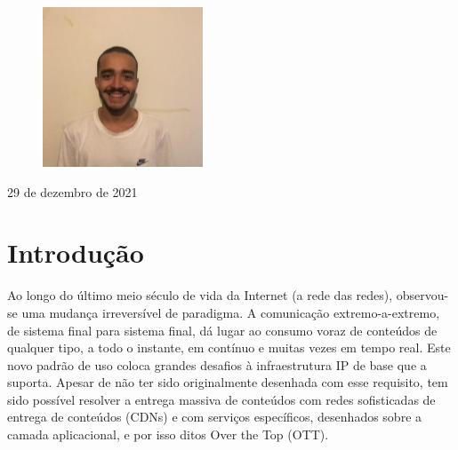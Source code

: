 \documentclass[a4paper, 11pt]{article}
\begin{document}
\begin{titlepage}
\begin{center}
\begin{figure}[!htb]
            \centering
            \captionsetup{pg47488}
        \endminipage
        \hspace{-0.2cm}
            \includegraphics[width=\linewidth]{images/Capa/154.jpg} 
            \centering
            \captionsetup{pg47577}
        \endminipage
    \end{figure}

\blindtext

\vspace{2cm}
        
        29 de dezembro de 2021
            
    \end{center}
\end{titlepage}

\newpage
\tableofcontents
\newpage
\section{Introdução}
Ao longo do último meio século de vida da Internet (a rede das redes), observou-se uma mudança irreversível de paradigma. A comunicação extremo-a-extremo, de sistema final para sistema final, dá lugar ao consumo voraz de conteúdos de qualquer tipo, a todo o instante, em contínuo e muitas vezes em tempo real. Este novo padrão de uso coloca grandes desafios à infraestrutura IP de base que a suporta. Apesar de não ter sido originalmente desenhada com esse requisito, tem sido possível resolver a entrega massiva de conteúdos com redes sofisticadas de entrega de conteúdos (CDNs) e com serviços específicos, desenhados sobre a camada aplicacional, e por isso ditos Over the Top (OTT). \\
\end{document}
